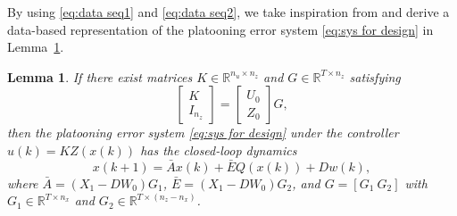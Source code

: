 \documentclass[letterpaper, 10 pt, conference]{ieeeconf}
\newtheorem{lemma}{Lemma}[section]
\begin{document}
	By using \eqref{eq:data seq1} and \eqref{eq:data seq2}, we take inspiration from \cite[Lemma 2]{Persis+23} and derive
	a data-based representation of the platooning error system \eqref{eq:sys for design} in 
	Lemma~\ref{lemma:data-based closed-loop sys}.
	\begin{lemma}\label{lemma:data-based closed-loop sys}
		If there exist matrices $K \in \mathbb{R}^{n_u \times n_z}$ and $G \in \mathbb{R}^{T \times n_z}$	satisfying
		\begin{equation}\label{eq:lemma data closed 1}
			\begin{bmatrix}
				K \\ I_{n_z}
			\end{bmatrix}	
			=
			\begin{bmatrix}
				U_0 \\ Z_0
			\end{bmatrix}	
			G,
		\end{equation}
		then the platooning error system \eqref{eq:sys for design} under the controller $u(k) = K Z(x(k))$ 
		has the closed-loop dynamics
		\begin{equation}\label{eq:lemma data closed 2}
			x(k+1) = \bar{A} x(k) + \bar{E} Q(x(k)) + D w(k),
		\end{equation}
		where $\bar{A} = (X_1 - D W_0) G_1$, $\bar{E} = (X_1 - D W_0) G_2$, and $G = 
		[G_1 ~ 
		G_2]$ with $G_1 \in \mathbb{R}^{T \times n_x}$ and $G_2 \in \mathbb{R}^{T 
			\times (n_z-n_x)}$.
	\end{lemma}
\end{document}
